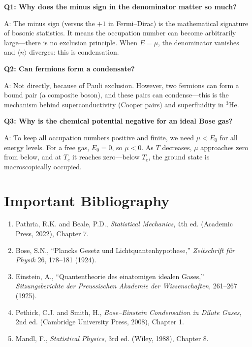 \textbf{Q1: Why does the minus sign in the denominator matter so much?}

A: The minus sign (versus the $+1$ in Fermi--Dirac) is the mathematical signature of bosonic statistics. It means the occupation number can become arbitrarily large---there is no exclusion principle. When $E = \mu$, the denominator vanishes and $\langle n \rangle$ diverges: this is condensation.

\textbf{Q2: Can fermions form a condensate?}

A: Not directly, because of Pauli exclusion. However, two fermions can form a bound pair (a composite boson), and these pairs can condense---this is the mechanism behind superconductivity (Cooper pairs) and superfluidity in $^3$He.

\textbf{Q3: Why is the chemical potential negative for an ideal Bose gas?}

A: To keep all occupation numbers positive and finite, we need $\mu < E_0$ for all energy levels. For a free gas, $E_0 = 0$, so $\mu < 0$. As $T$ decreases, $\mu$ approaches zero from below, and at $T_c$ it reaches zero---below $T_c$, the ground state is macroscopically occupied.
\section*{Important Bibliography}

\begin{enumerate}
\item Pathria, R.K. and Beale, P.D., \textit{Statistical Mechanics}, 4th ed. (Academic Press, 2022), Chapter 7.
\item Bose, S.N., ``Plancks Gesetz und Lichtquantenhypothese,'' \textit{Zeitschrift f\"ur Physik} 26, 178--181 (1924).
\item Einstein, A., ``Quantentheorie des einatomigen idealen Gases,'' \textit{Sitzungsberichte der Preussischen Akademie der Wissenschaften}, 261--267 (1925).
\item Pethick, C.J. and Smith, H., \textit{Bose--Einstein Condensation in Dilute Gases}, 2nd ed. (Cambridge University Press, 2008), Chapter 1.
\item Mandl, F., \textit{Statistical Physics}, 3rd ed. (Wiley, 1988), Chapter 8.
\end{enumerate}

